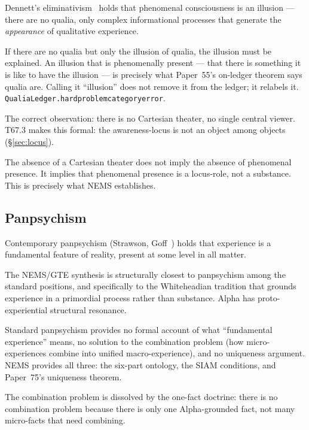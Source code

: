 \documentclass[11pt]{article}
\theoremstyle{remark}
\newcommand{\lean}[1]{%
  \penalty-100
  \begingroup\def\_{\textunderscore\allowbreak}\texttt{#1}\endgroup}
\begin{document}
Dennett's eliminativism~\cite{Dennett1991} holds that phenomenal consciousness is an
illusion --- there are no qualia, only complex informational processes that generate
the \emph{appearance} of qualitative experience.

\medskip
\begin{termlist}
  \item[The self-undermining problem]
    If there are no qualia but only the illusion of qualia, the illusion must be
    explained. An illusion that is phenomenally present --- that there is something
    it is like to have the illusion --- is precisely what Paper~55's on-ledger theorem
    says qualia are. Calling it ``illusion'' does not remove it from the ledger; it
    relabels it. \lean{QualiaLedger.hard\_problem\_category\_error}.

  \item[What Dennett gets right]
    The correct observation: there is no Cartesian theater, no single central viewer.
    T67.3 makes this formal: the awareness-locus is not an object among objects
    (\S\ref{sec:locus}).

  \item[The wrong conclusion]
    The absence of a Cartesian theater does not imply the absence of phenomenal
    presence. It implies that phenomenal presence is a locus-role, not a substance.
    This is precisely what NEMS establishes.
\end{termlist}

\subsection{Panpsychism}

Contemporary panpsychism (Strawson, Goff~\cite{Goff2019}) holds that experience is
a fundamental feature of reality, present at some level in all matter.

\medskip
\begin{termlist}
  \item[Structural overlap]
    The NEMS/GTE synthesis is structurally closest to panpsychism among the standard
    positions, and specifically to the Whiteheadian tradition that grounds experience
    in a primordial process rather than substance. Alpha has proto-experiential
    structural resonance.

  \item[Key difference: precision]
    Standard panpsychism provides no formal account of what ``fundamental experience''
    means, no solution to the combination problem (how micro-experiences combine into
    unified macro-experience), and no uniqueness argument. NEMS provides all three:
    the six-part ontology, the SIAM conditions, and Paper~75's uniqueness theorem.

  \item[Combination problem dissolved]
    The combination problem is dissolved by the one-fact doctrine: there is no
    combination problem because there is only one Alpha-grounded fact, not many
    micro-facts that need combining.
\end{termlist}
\end{document}
